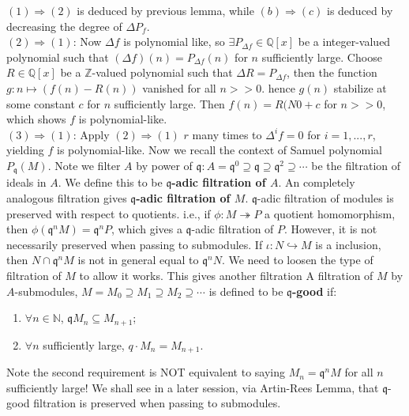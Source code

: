 \documentclass[12pt]{article}
\theoremstyle{definition}
\theoremstyle{plain}
\newcommand{\nat}{\mathbb{N}}
\newcommand{\rat}{\mathbb{Q}}
\newcommand{\z}{\mathbb{Z}}
\newcommand{\inj}{\hookrightarrow}
\newcommand{\surj}{\twoheadrightarrow}
\begin{document}
\proof $(1)\Rightarrow (2)$ is deduced by previous lemma, while $(b)\Rightarrow (c)$ is deduced by decreasing the degree of $\Delta P_f$.\\
\indent $(2)\Rightarrow (1)$: Now $\Delta f$ is polynomial like, so $\exists P_{\Delta f}\in \rat[x]$ be a integer-valued polynomial such that $(\Delta f)(n)=P_{\Delta f}(n)$ for $n$ sufficiently large. Choose $R\in \rat[x]$ be a $\z$-valued polynomial such that $\Delta R=P_{\Delta f}$, then the function $g:n \mapsto (f(n)-R(n))$ vanished for all $n>>0$. hence $g(n)$ stabilize at some constant $c$ for $n$ sufficiently large. Then $f(n)=R(N0+c$ for $n>>0$, which shows $f$ is polynomial-like.\\
\indent $(3)\Rightarrow (1)$: Apply $(2)\Rightarrow (1)$ $r$ many times to $\Delta^i f=0$ for $i=1, ..., r$, yielding $f$ is polynomial-like.
Now we recall the context of Samuel polynomial $P_\mathfrak{q}(M)$. Note we filter $A$ by power of $\mathfrak{q}: A=\mathfrak{q}^0\supseteq \mathfrak{q}\supseteq \mathfrak{q}^2\supseteq\cdots$ be the filtration of ideals in $A$. We define this to be \textbf{$\mathfrak{q}$-adic filtration of $A$}. An completely analogous filtration gives \textbf{$\mathfrak{q}$-adic filtration of $M$}.
\Rmk $\mathfrak{q}$-adic filtration of modules is preserved with respect to quotients. i.e., if $\phi:M\surj P$ a quotient homomorphism, then $\phi(\mathfrak{q}^nM)=\mathfrak{q}^nP$, which gives a $\mathfrak{q}$-adic filtration of $P$. However, it is not necessarily preserved when passing to submodules.
\Exe If $\iota:N\inj M$ is a inclusion, then $N\cap \mathfrak{q}^n M$ is not in general equal to $\mathfrak{q}^nN$. We need to loosen the type of filtration of $M$ to allow it works. This gives another filtration
\Def A filtration of $M$ by $A$-submodules, $M=M_0\supseteq M_1\supseteq M_2\supseteq \cdots$ is defined to be \textbf{$\mathfrak{q}$-good} if:
\begin{enumerate}
  \item $\forall n\in \nat$, $\mathfrak{q}M_n\subseteq M_{n+1}$;
  \item $\forall n$ sufficiently large, $q\cdot M_n=M_{n+1}$.
\end{enumerate}
\Rmk Note the second requirement is NOT equivalent to saying $M_n=\mathfrak{q}^nM$ for all $n$ sufficiently large! We shall see in a later session, via Artin-Rees Lemma, that $\mathfrak{q}$-good filtration is preserved when passing to submodules.
\end{document}
